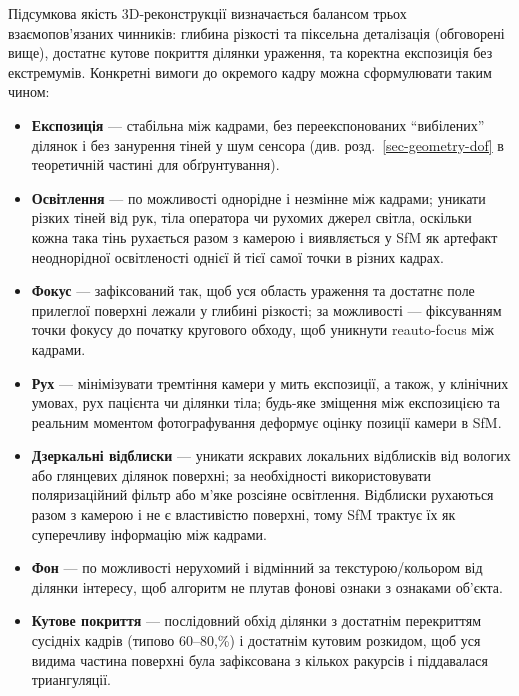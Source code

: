 \documentclass[
  ukrainian,
  10pt,
  a4paper,
  twocolumn]{article}
\providecommand{\tightlist}{%
  \setlength{\itemsep}{0pt}\setlength{\parskip}{0pt}}
\begin{document}
Підсумкова якість 3D-реконструкції визначається балансом трьох
взаємопов'язаних чинників: глибина різкості та піксельна деталізація
(обговорені вище), достатнє кутове покриття ділянки ураження, та
коректна експозиція без екстремумів. Конкретні вимоги до окремого кадру
можна сформулювати таким чином:

\begin{itemize}
\tightlist
\item
  \textbf{Експозиція} --- стабільна між кадрами, без переекспонованих
  ``вибілених'' ділянок і без занурення тіней у шум сенсора (див.
  розд.~\ref{sec-geometry-dof} в теоретичній частині для обґрунтування).
\item
  \textbf{Освітлення} --- по можливості однорідне і незмінне між
  кадрами; уникати різких тіней від рук, тіла оператора чи рухомих
  джерел світла, оскільки кожна така тінь рухається разом з камерою і
  виявляється у SfM як артефакт неоднорідної освітленості однієї й тієї
  самої точки в різних кадрах.
\item
  \textbf{Фокус} --- зафіксований так, щоб уся область ураження та
  достатнє поле прилеглої поверхні лежали у глибині різкості; за
  можливості --- фіксуванням точки фокусу до початку кругового обходу,
  щоб уникнути reauto-focus між кадрами.
\item
  \textbf{Рух} --- мінімізувати тремтіння камери у мить експозиції, а
  також, у клінічних умовах, рух пацієнта чи ділянки тіла; будь-яке
  зміщення між експозицією та реальним моментом фотографування деформує
  оцінку позиції камери в SfM.
\item
  \textbf{Дзеркальні відблиски} --- уникати яскравих локальних
  відблисків від вологих або глянцевих ділянок поверхні; за необхідності
  використовувати поляризаційний фільтр або м'яке розсіяне освітлення.
  Відблиски рухаються разом з камерою і не є властивістю поверхні, тому
  SfM трактує їх як суперечливу інформацію між кадрами.
\item
  \textbf{Фон} --- по можливості нерухомий і відмінний за
  текстурою/кольором від ділянки інтересу, щоб алгоритм не плутав фонові
  ознаки з ознаками об'єкта.
\item
  \textbf{Кутове покриття} --- послідовний обхід ділянки з достатнім
  перекриттям сусідніх кадрів (типово 60--80,\%) і достатнім кутовим
  розкидом, щоб уся видима частина поверхні була зафіксована з кількох
  ракурсів і піддавалася триангуляції.
\end{itemize}

\FloatBarrier
\end{document}
